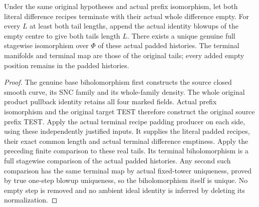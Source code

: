 \begin{theorem}
\label{hir:sharp-actual-curve-biholo-terminal-padded-recipes}
\leanok
Under the same original hypotheses and actual prefix isomorphism, let both
literal difference recipes terminate with their actual whole difference
empty. For every $L$ at least both tail lengths, append the actual identity
blowups of the empty centre to give both tails length $L$. There exists a
unique genuine full stagewise isomorphism over $\Phi$ of these actual padded
histories. The terminal manifolds and terminal map are those of the original
tails; every added empty position remains in the padded histories.
\end{theorem}
\begin{proof}
The genuine base biholomorphism first constructs the source closed smooth
curve, its SNC family and its whole-family density. The whole original
product pullback identity retains all four marked fields. Actual prefix
isomorphism and the original target TEST therefore construct the original
source prefix TEST. Apply the actual terminal recipe padding producer on
each side, using these independently justified inputs. It supplies the
literal padded recipes, their exact common length and actual terminal
difference emptiness. Apply the preceding finite comparison to these real
tails. Its terminal biholomorphism is a full stagewise comparison of the
actual padded histories. Any second such comparison has the same terminal
map by actual fixed-tower uniqueness, proved by true one-step blowup
uniqueness, so the biholomorphism itself is unique. No empty step is removed
and no ambient ideal identity is inferred by deleting its normalization.
\end{proof}

